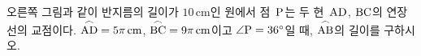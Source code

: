 \noindent\begin{minipage}[t]{0.58\linewidth}\vspace{0pt}\raggedright 오른쪽 그림과 같이 반지름의 길이가 $10\,\mathrm{cm}$인 원에서 점~$\mathrm{P}$는 두 현~$\mathrm{AD}$, $\mathrm{BC}$의 연장선의 교점이다. $\overset{\frown}{\mathrm{AD}}=5\pi\,\mathrm{cm}$, $\overset{\frown}{\mathrm{BC}}=9\pi\,\mathrm{cm}$이고 $\angle\mathrm{P}=36^\circ$일 때, $\overset{\frown}{\mathrm{AB}}$의 길이를 구하시오.\end{minipage}\hfill\begin{minipage}[t]{0.4\linewidth}\vspace{0pt}\centering \resizebox{\ifdim\width>\linewidth\linewidth\else\width\fi}{!}{}\end{minipage}\par

